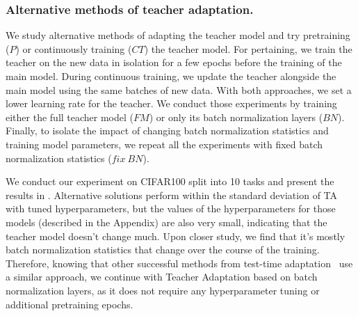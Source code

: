 \documentclass[10pt,twocolumn,letterpaper]{article}
\newcommand\rev[1]{{#1}}
\begin{document}
\subsubsection{Alternative methods of teacher adaptation.} \rev{We study alternative methods of adapting the teacher model and try pretraining ($P$) or continuously training ($CT$) the teacher model. For pertaining, we train the teacher on the new data in isolation for a few epochs before the training of the main model. During continuous training, we update the teacher alongside the main model using the same batches of new data. With both approaches, we set a lower learning rate for the teacher. We conduct those experiments by training either the full teacher model ($FM$) or only its batch normalization layers ($BN$). Finally, to isolate the impact of changing batch normalization statistics and training model parameters, we repeat all the experiments with fixed batch normalization statistics ($fix\ BN$). 


We conduct our experiment on CIFAR100 split into 10 tasks and present the results in \Cref{tab:ta_ablations}. Alternative solutions perform within the standard deviation of TA with tuned hyperparameters, but the values of the hyperparameters for those models (described in the Appendix) are also very small, indicating that the teacher model doesn't change much. Upon closer study, we find that it's mostly batch normalization statistics that change over the course of the training. Therefore, knowing that other successful methods from test-time adaptation~\cite{TENT} use a similar approach, we continue with Teacher Adaptation based on batch normalization layers, as it does not require any hyperparameter tuning or additional pretraining epochs.
}
\end{document}
